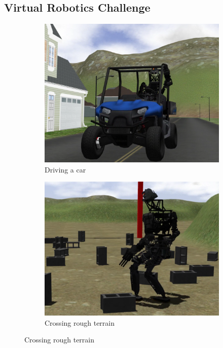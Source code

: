 \subsection{Virtual Robotics Challenge}
\begin{figure}
  \centering
  \begin{subfigure}[b]{0.3\textwidth}
    \includegraphics[width=\textwidth]{pics/darpa_car}
    \caption{Driving a car}
    \label{fig:vrc_car}
  \end{subfigure}
  \begin{subfigure}[b]{0.3\textwidth}
    \includegraphics[width=\textwidth]{pics/darpa_walking}
    \caption{Crossing rough terrain}

\end{subfigure}
\end{figure}
